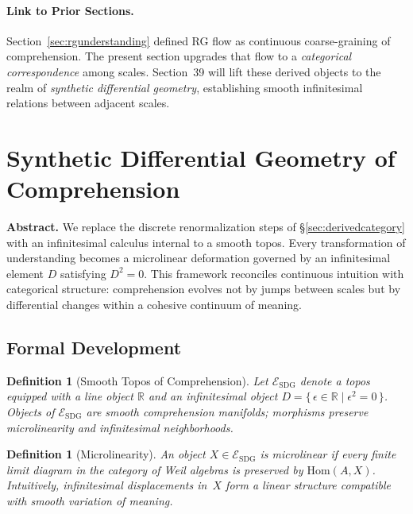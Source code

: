 \documentclass[12pt,a4paper,twoside,openright]{book}
\newtheorem{definition}[theorem]{Definition}
\begin{document}
\paragraph{Link to Prior Sections.}
Section~\ref{sec:rgunderstanding} defined RG flow
as continuous coarse-graining of comprehension.
The present section upgrades that flow to a
\emph{categorical correspondence} among scales.
Section~39 will lift these derived objects
to the realm of \emph{synthetic differential geometry},
establishing smooth infinitesimal relations between adjacent scales.


\section{Synthetic Differential Geometry of Comprehension}
\label{sec:sdgunderstanding}

\textbf{Abstract.}
We replace the discrete renormalization steps of §\ref{sec:derivedcategory}
with an infinitesimal calculus internal to a smooth topos.
Every transformation of understanding becomes a microlinear deformation
governed by an infinitesimal element $D$ satisfying $D^2=0$.
This framework reconciles continuous intuition with categorical structure:
comprehension evolves not by jumps between scales but by differential
changes within a cohesive continuum of meaning.

\subsection*{Formal Development}

\begin{definition}[Smooth Topos of Comprehension]
Let $\mathcal{E}_{\mathrm{SDG}}$ denote a topos
equipped with a line object $\mathbb{R}$ and an infinitesimal object
$D=\{\,\epsilon\in\mathbb{R}\mid\epsilon^2=0\,\}$.
Objects of $\mathcal{E}_{\mathrm{SDG}}$ are \emph{smooth comprehension manifolds};
morphisms preserve microlinearity and infinitesimal neighborhoods.
\end{definition}

\begin{definition}[Microlinearity]
An object $X\in\mathcal{E}_{\mathrm{SDG}}$ is \emph{microlinear}
if every finite limit diagram in the category of Weil algebras
is preserved by $\mathrm{Hom}(A,X)$.
Intuitively, infinitesimal displacements in~$X$
form a linear structure compatible with smooth variation of meaning.
\end{definition}
\end{document}
